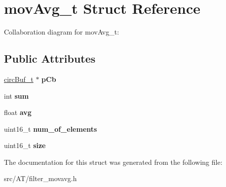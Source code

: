 \hypertarget{structmovAvg__t}{}\section{mov\+Avg\+\_\+t Struct Reference}
\label{structmovAvg__t}


Collaboration diagram for mov\+Avg\+\_\+t\+:
\subsection*{Public Attributes}
\begin{DoxyCompactItemize}
\item 
\mbox{\label{structmovAvg__t_a27bd5587d5a9c59092555d7a63bd48a7}} 
\hyperlink{structcircBuf__t}{circ\+Buf\+\_\+t} $\ast$ {\bfseries p\+Cb}
\item 
\mbox{\label{structmovAvg__t_a2b72e449745e1ef3a0d73de27894bf61}} 
int {\bfseries sum}
\item 
\mbox{\label{structmovAvg__t_ab8e686302c6540e0dbd71f004b050cfc}} 
float {\bfseries avg}
\item 
\mbox{\label{structmovAvg__t_a7e078cec0e2e4c126cedd8a32c774f29}} 
uint16\+\_\+t {\bfseries num\+\_\+of\+\_\+elements}
\item 
\mbox{\label{structmovAvg__t_ad9c04a4e0a0b728b3bf189b446dcb931}} 
uint16\+\_\+t {\bfseries size}
\end{DoxyCompactItemize}


The documentation for this struct was generated from the following file\+:\begin{DoxyCompactItemize}
\item 
src/\+A\+T/filter\+\_\+movavg.\+h\end{DoxyCompactItemize}
